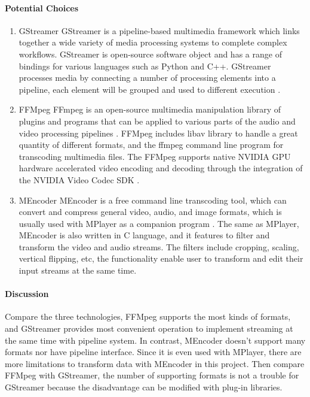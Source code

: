 \paragraph{Potential Choices}
\begin{enumerate}
\item{GStreamer}
GStreamer is a pipeline-based multimedia framework which links together a wide variety of media processing systems to complete complex workflows. GStreamer is open-source software object and has
 a range of bindings for various languages such as Python and C++. GStreamer processes media
  by connecting a number of processing elements into a pipeline, each element will be grouped and 
  used to different execution \cite{gstreamer}.\\

\item{FFMpeg}
FFmpeg is an open-source multimedia manipulation library of plugins and programs that can be applied to 
various parts of the audio and video processing pipelines \cite{ffmpeg}. FFMpeg includes libav library 
to handle a great quantity of different formats, and the ffmpeg command line program for transcoding 
multimedia files. The FFMpeg supports native NVIDIA GPU hardware accelerated video encoding and decoding 
through the integration of the NVIDIA Video Codec SDK \cite{nvidia}.\\

\item{MEncoder}
MEncoder is a free command line transcoding tool, which can convert and compress general video, audio, 
and image formats, which is usually used with MPlayer as a companion program \cite{mplay}. The same as MPlayer, 
MEncoder is also written in C language, and it features to filter and transform the video and audio 
streams. The filters include cropping, scaling, vertical flipping, etc, the functionality enable user to 
transform and edit their input streams at the same time.\\
\end{enumerate}

\paragraph{Discussion}
Compare the three technologies, FFMpeg supports the most kinds of formats, and GStreamer provides most 
convenient operation to implement streaming at the same time with pipeline system. In contrast, MEncoder 
doesn’t support many formats nor have pipeline interface. Since it is even used with MPlayer, there are 
more limitations to transform data with MEncoder in this project. Then compare FFMpeg with GStreamer, the 
number of supporting formats is not a trouble for GStreamer because the disadvantage can be modified with 
plug-in libraries.\\

